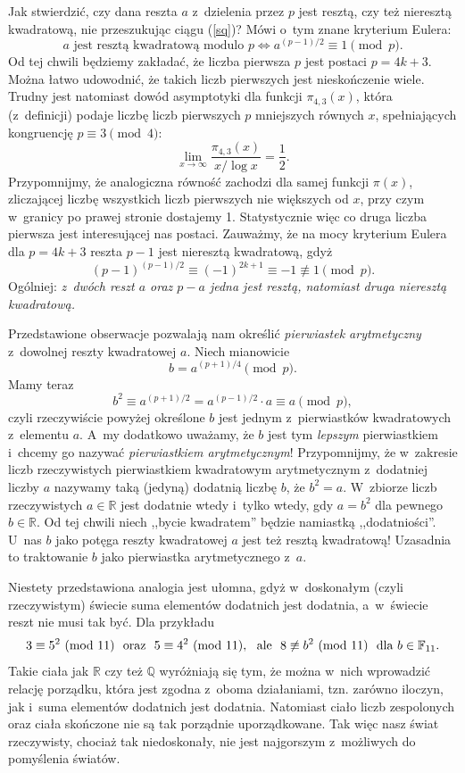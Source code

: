 Jak stwierdzić, czy dana reszta $a$ z~dzielenia przez $p$ jest resztą, czy też
nieresztą kwadratową, nie przeszukując ciągu (\ref{sq})? Mówi o~tym znane kryterium Eulera:
$$
\textrm{$a$ jest resztą
kwadratową modulo $p$}\iff a^{(p-1)/2}\equiv
1\pmod{p}.
$$
 Od tej chwili będziemy zakładać,  że  liczba pierwsza $p$ jest postaci $p=4k+3$.
 Można łatwo udowodnić, że takich liczb pierwszych jest nieskończenie wiele. Trudny jest natomiast dowód asymptotyki dla funkcji 
$\pi_{4,3}(x)$, która (z~definicji) podaje liczbę liczb pierwszych $p$
mniejszych równych $x$, spełniających kongruencję $p\equiv 3\pmod{4}$:
$$
\lim_{x\to\infty}\frac{\pi_{4,3}(x)}{x/\log x}=\frac{1}{2}.
$$
Przypomnijmy, że analogiczna równość zachodzi dla samej funkcji $\pi(x)$, zliczającej liczbę wszystkich
liczb pierwszych nie większych od $x$, przy czym w~granicy po prawej stronie
dostajemy 1.
Statystycznie więc co druga liczba pierwsza jest interesującej nas postaci. 
Zauważmy, że na mocy kryterium Eulera dla
$p=4k+3$ reszta $p-1$ jest nieresztą kwadratową, gdyż
$$
(p-1)^{(p-1)/2}\equiv (-1)^{2k+1}\equiv-1\not\equiv 1\pmod{p}.
$$
Ogólniej: {\it z~dwóch reszt $a$ oraz $p-a$ jedna jest resztą, natomiast druga nieresztą kwadratową.}

Przedstawione obserwacje pozwalają
 nam określić {\it pierwiastek arytmetyczny} z~dowolnej reszty kwadratowej $a$. Niech mianowicie 
$$
b= a^{(p+1)/4} \pmod{p}.
$$
Mamy teraz 
$$
b^2\equiv a^{(p+1)/2}= a^{(p-1)/2}\cdot a\equiv a\pmod{p},
$$
czyli rzeczywiście powyżej określone $b$ jest jednym z~pierwiastków kwadratowych
z~elementu $a$. A~my dodatkowo  uważamy, że $b$ jest tym
\textit{lepszym}
pierwiastkiem i~chcemy go nazywać {\it pierwiastkiem arytmetycznym}!
Przypomnijmy, że w~zakresie liczb rzeczywistych pierwiastkiem kwadratowym
arytmetycznym z~dodatniej liczby $a$ nazywamy taką (jedyną) dodatnią liczbę $b$,
że \vadjust{\goodbreak}$b^2=a$.  
W~zbiorze liczb rzeczywistych $a\in
\mathbb{R}$ jest dodatnie wtedy i~tylko wtedy, gdy $a=b^2$ dla pewnego
$b\in\mathbb R$.
Od tej chwili niech ,,bycie kwadratem'' będzie namiastką
,,dodatniości''.  
U~nas $b$ jako potęga reszty kwadratowej $a$ jest też resztą
kwadratową! Uzasadnia to traktowanie $b$ jako pierwiastka arytmetycznego z~$a$.

Niestety przedstawiona analogia jest ułomna, gdyż w~doskonałym
(czyli rzeczywistym) świecie suma elementów dodatnich jest dodatnia, a~w~świecie
reszt nie musi tak być. Dla przykładu
$$
3\equiv 5^2\ppmod{11}\ \mbox{ oraz }\ 5\equiv 4^2\ppmod{11},\ \mbox{ ale }\ 
8\not\equiv b^2\ppmod{11}\ \mbox{ dla }b\in \mathbb F_{11}. 
$$
Takie ciała jak $\mathbb R$ czy też $\mathbb Q$ wyróżniają się tym, że można w~nich wprowadzić relację porządku, która jest zgodna z~oboma działaniami, tzn. zarówno
iloczyn, jak i~suma elementów dodatnich jest dodatnia. Natomiast ciało liczb
zespolonych oraz ciała skończone nie są tak porządnie uporządkowane. Tak więc
nasz świat rzeczywisty, chociaż tak niedoskonały,  nie jest najgorszym z~możliwych do pomyślenia  światów. 

